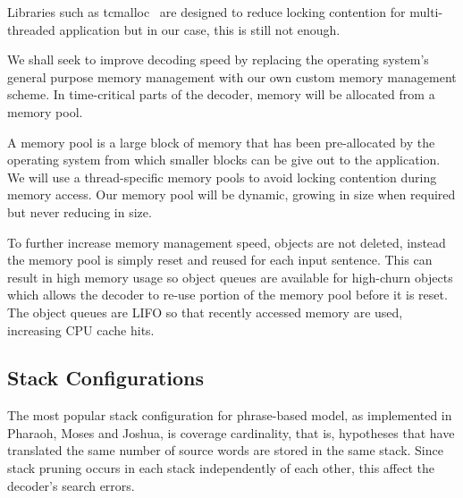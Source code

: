\documentclass[11pt]{article}
\begin{document}
Libraries such as tcmalloc~\cite{ghemawat2009tcmalloc} are designed to reduce locking contention for multi-threaded application but in our case, this is still not enough. 

We shall seek to improve decoding speed by replacing the operating system's general purpose memory management with our own custom memory management scheme. In time-critical parts of the decoder, memory will be allocated from a memory pool. 

A memory pool is a large block of memory that has been pre-allocated by the operating system from which smaller blocks can be give out to the application. We will use a thread-specific memory pools to avoid locking contention during memory access. Our memory pool will be dynamic, growing in size when required but never reducing in size.

To further increase memory management speed, objects are not deleted, instead the memory pool is simply reset and reused for each input sentence. This can result in high memory usage so object queues are available for high-churn objects which allows the decoder to re-use portion of the memory pool before it is reset. The object queues are LIFO so that recently accessed memory are used, increasing CPU cache hits.



\subsection{Stack Configurations}

The most popular stack configuration for phrase-based model, as implemented in Pharaoh, Moses and Joshua, is coverage cardinality, that is, hypotheses that have translated the same number of source words are stored in the same stack. Since stack pruning occurs in each stack independently of each other, this affect the decoder's search errors.
\end{document}
